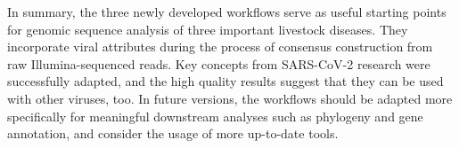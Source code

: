 In summary, the three newly developed workflows serve as useful starting points for genomic sequence analysis of three important livestock diseases. They incorporate viral attributes during the process of consensus construction from raw Illumina-sequenced reads. Key concepts from \ac{SARS-CoV-2} research were successfully adapted, and the high quality results suggest that they can be used with other viruses, too. In future versions, the workflows should be adapted more specifically for meaningful downstream analyses such as phylogeny and gene annotation, and consider the usage of more up-to-date tools.
